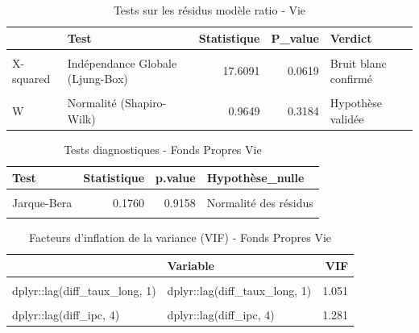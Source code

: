 \documentclass[
]{article}
\begin{document}
\begin{longtable}[t]{llrrl}
\caption{\label{tab:unnamed-chunk-45}Tests sur les résidus modèle ratio - Vie}\\
\toprule
 & Test & Statistique & P\_value & Verdict\\
\midrule
\cellcolor{gray!10}{DW} & \cellcolor{gray!10}{Autocorrélation (Durbin-Watson)} & \cellcolor{gray!10}{2.6972} & \cellcolor{gray!10}{0.9789} & \cellcolor{gray!10}{Hypothèse validée}\\
X-squared & Indépendance Globale (Ljung-Box) & 17.6091 & 0.0619 & Bruit blanc confirmé\\
\cellcolor{gray!10}{BP} & \cellcolor{gray!10}{Homoscédasticité (Breusch-Pagan)} & \cellcolor{gray!10}{4.5900} & \cellcolor{gray!10}{0.5974} & \cellcolor{gray!10}{Hypothèse validée}\\
W & Normalité (Shapiro-Wilk) & 0.9649 & 0.3184 & Hypothèse validée\\
\bottomrule
\end{longtable}

\begin{longtable}[t]{lrrl}
\caption{\label{tab:unnamed-chunk-46}Tests diagnostiques - Fonds Propres Vie}\\
\toprule
Test & Statistique & p.value & Hypothèse\_nulle\\
\midrule
\cellcolor{gray!10}{Ljung-Box} & \cellcolor{gray!10}{0.0971} & \cellcolor{gray!10}{0.7554} & \cellcolor{gray!10}{Pas d'autocorrélation}\\
Jarque-Bera & 0.1760 & 0.9158 & Normalité des résidus\\
\cellcolor{gray!10}{Breusch-Pagan} & \cellcolor{gray!10}{1.7255} & \cellcolor{gray!10}{0.7861} & \cellcolor{gray!10}{Homoscédasticité}\\
\bottomrule
\end{longtable}

\begin{longtable}[t]{llr}
\caption{\label{tab:unnamed-chunk-46}Facteurs d'inflation de la variance (VIF) - Fonds Propres Vie}\\
\toprule
 & Variable & VIF\\
\midrule
\cellcolor{gray!10}{dplyr::lag(diff\_fonds\_propres, 1)} & \cellcolor{gray!10}{dplyr::lag(diff\_fonds\_propres, 1)} & \cellcolor{gray!10}{1.309}\\
dplyr::lag(diff\_taux\_long, 1) & dplyr::lag(diff\_taux\_long, 1) & 1.051\\
\cellcolor{gray!10}{dplyr::lag(rendement\_sp500, 2)} & \cellcolor{gray!10}{dplyr::lag(rendement\_sp500, 2)} & \cellcolor{gray!10}{1.068}\\
dplyr::lag(diff\_ipc, 4) & dplyr::lag(diff\_ipc, 4) & 1.281\\
\bottomrule
\end{longtable}
\end{document}
